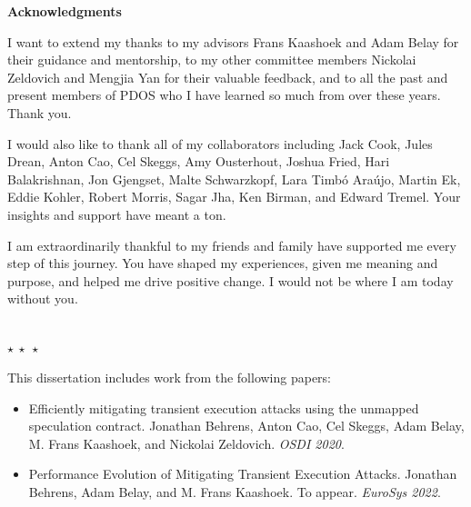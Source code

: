 
{\noindent \huge \bf Acknowledgments\\}

I want to extend my thanks to my advisors Frans Kaashoek and Adam Belay
for their guidance and mentorship, to my other committee members Nickolai Zeldovich and Mengjia Yan for their valuable feedback, and to all the past and present members of PDOS who I have learned so much from over these years.
Thank you.

I would also like to thank all of my collaborators including Jack Cook, Jules Drean, Anton Cao, Cel Skeggs, Amy Ousterhout, Joshua Fried, Hari Balakrishnan, Jon Gjengset, Malte Schwarzkopf, Lara Timbó Araújo, Martin Ek, Eddie Kohler, Robert Morris, Sagar Jha, Ken Birman, and Edward Tremel. Your insights and support have meant a ton.

I am extraordinarily thankful to my friends and family have supported me every step of this journey.
You have shaped my experiences, given me meaning and purpose, and helped me drive positive change.
I would not be where I am today without you.

\begin{center}
    ~\\[0.5\baselineskip]
    $\star~\star~\star$
    ~\\[\baselineskip]
\end{center}


\noindent
This dissertation includes work from the following papers:
\begin{itemize}
\item Efficiently mitigating transient execution attacks using the unmapped speculation contract.
    Jonathan Behrens, Anton Cao, Cel Skeggs, Adam Belay, M. Frans Kaashoek, and Nickolai Zeldovich.
    \textit{OSDI 2020}.
\item Performance Evolution of Mitigating Transient Execution Attacks.
    Jonathan Behrens, Adam Belay, and M. Frans Kaashoek.
    To appear. \textit{\mbox{EuroSys} 2022}.
\end{itemize}
